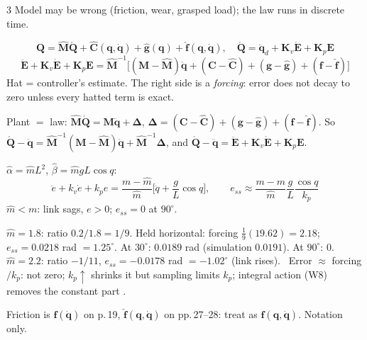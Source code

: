 \begin{multicols}{3}
Model may be wrong (friction, wear, grasped load); the law runs in discrete time.
\begin{fbx}
\[\mathbf Q=\hat{\mathbf M}\acute{\mathbf Q}+\hat{\mathbf C}(\mathbf q,\dot{\mathbf q})+\hat{\mathbf g}(\mathbf q)+\hat{\mathbf f}(\mathbf q,\dot{\mathbf q}),\quad \acute{\mathbf Q}=\ddot{\mathbf q}_d+\mathbf K_v\dot{\mathbf E}+\mathbf K_p\mathbf E\]
\[\ddot{\mathbf E}+\mathbf K_v\dot{\mathbf E}+\mathbf K_p\mathbf E=\hat{\mathbf M}^{-1}\Big[(\mathbf M-\hat{\mathbf M})\ddot{\mathbf q}+(\mathbf C-\hat{\mathbf C})+(\mathbf g-\hat{\mathbf g})+(\mathbf f-\hat{\mathbf f})\Big]\]
Hat = controller's estimate. The right side is a \emph{forcing}: error does not decay to zero unless every hatted term is exact.
\end{fbx}
\begin{deriv}
Plant $=$ law: $\hat{\mathbf M}\acute{\mathbf Q}=\mathbf M\ddot{\mathbf q}+\boldsymbol\Delta$, $\boldsymbol\Delta=(\mathbf C-\hat{\mathbf C})+(\mathbf g-\hat{\mathbf g})+(\mathbf f-\hat{\mathbf f})$. So $\acute{\mathbf Q}-\ddot{\mathbf q}=\hat{\mathbf M}^{-1}(\mathbf M-\hat{\mathbf M})\ddot{\mathbf q}+\hat{\mathbf M}^{-1}\boldsymbol\Delta$, and $\acute{\mathbf Q}-\ddot{\mathbf q}=\ddot{\mathbf E}+\mathbf K_v\dot{\mathbf E}+\mathbf K_p\mathbf E$. \chk
\end{deriv}
\begin{fbx}
$\hat\alpha=\hat mL^2$, $\hat\beta=\hat mgL\cos q$:
\[\ddot e+k_v\dot e+k_pe=\frac{m-\hat m}{\hat m}\Big[\ddot q+\frac gL\cos q\Big],\qquad e_{ss}\approx\frac{m-\hat m}{\hat m}\frac gL\frac{\cos q}{k_p}\]
$\hat m<m$: link sags, $e>0$; $e_{ss}=0$ at $90^\circ$. \chk
\end{fbx}
\begin{worked}[scenario: mass 10\,\% off; $m=2$, $L=0.5$, $k_p=100$, $k_v=20$, $g/L=19.62$]\label{w9:ten}
$\hat m=1.8$: ratio $0.2/1.8=1/9$. Held horizontal: forcing $\tfrac19(19.62)=2.18$; $e_{ss}=0.0218$ rad $=1.25^\circ$. At $30^\circ$: $0.0189$ rad (simulation $0.0191$). At $90^\circ$: $0$. $\hat m=2.2$: ratio $-1/11$, $e_{ss}=-0.0178$ rad $=-1.02^\circ$ (link rises). \chk\ Error $\approx$ forcing$/k_p$: not zero; $k_p\uparrow$ shrinks it but sampling limits $k_p$; integral action (W8) removes the constant part \added.
\end{worked}
\begin{slideerr}[p.\,19 vs 27]
Friction is $\mathbf f(\dot{\mathbf q})$ on p.\,19, $\hat{\mathbf f}(\mathbf q,\dot{\mathbf q})$ on pp.\,27--28: treat as $\mathbf f(\mathbf q,\dot{\mathbf q})$. Notation only.

\end{slideerr}
\end{multicols}
